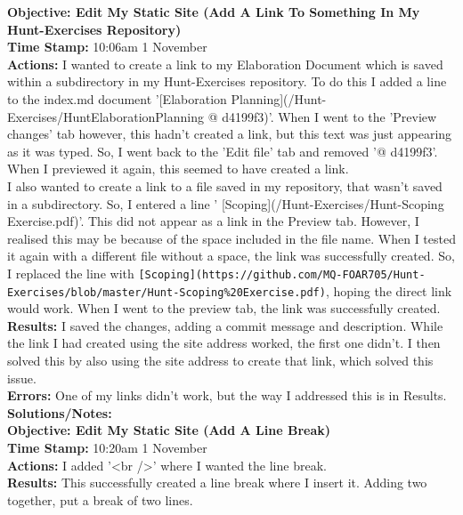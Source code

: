\documentclass{article}
\begin{document}
\begin{FlushLeft}
\vspace{5mm}
\textbf{Objective: Edit My Static Site (Add A Link To Something In My Hunt-Exercises Repository)}\\ 
\textbf{Time Stamp:} 10:06am 1 November\\
\textbf{Actions:} I wanted to create a link to my Elaboration Document which is saved within a subdirectory in my Hunt-Exercises repository. To do this I added a line to the index.md document '[Elaboration Planning](/Hunt-Exercises/Hunt\textunderscore Elaboration\textunderscore Planning @ d4199f3)'. When I went to the 'Preview changes' tab however, this hadn't created a link, but this text was just appearing as it was typed. So, I went back to the 'Edit file' tab and removed '@ d4199f3'. When I previewed it again, this seemed to have created a link.\\
I also wanted to create a link to a file saved in my repository, that wasn't saved in a subdirectory. So, I entered a line '
[Scoping](/Hunt-Exercises/Hunt-Scoping Exercise.pdf)'. This did not appear as a link in the Preview tab. However, I realised this may be because of the space included in the file name. When I tested it again with a different file without a space, the link was successfully created. So, I replaced the line with \verb|[Scoping](https://github.com/MQ-FOAR705/Hunt-Exercises/blob/master/Hunt-Scoping%20Exercise.pdf)|, hoping the direct link would work. When I went to the preview tab, the link was successfully created.\\
\textbf{Results:} I saved the changes, adding a commit message and description. While the link I had created using the site address worked, the first one didn't. I then solved this by also using the site address to create that link, which solved this issue.\\
\textbf{Errors:} One of my links didn't work, but the way I addressed this is in Results.\\
\textbf{Solutions/Notes:}\\
\vspace{5mm}
\textbf{Objective: Edit My Static Site (Add A Line Break)}\\ 
\textbf{Time Stamp:} 10:20am 1 November\\
\textbf{Actions:} I added '\textless br /\textgreater' where I wanted the line break. \\
\textbf{Results:} This successfully created a line break where I insert it. Adding two together, put a break of two lines.\\

\end{FlushLeft}
\end{document}
